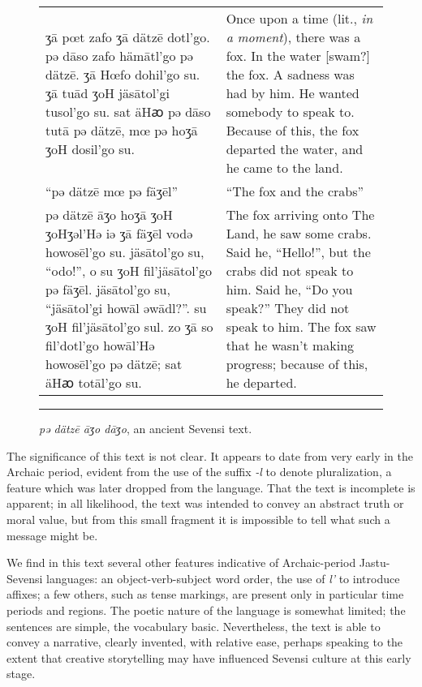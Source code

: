 \begin{figure}[ht]

\centering\small

\begin{tabular}{p{200pt}p{200pt}}
{\raggedleft ʒā pœt zafo ʒā dätzē dotl’go.
pǝ dāso zafo hämātl’go pǝ dätzē.
ʒā Hœfo dohil'go su.
ʒā tuād ʒoH jäsātol’gi tusol’go su.
sat äHꜵ pǝ dāso tutā pǝ dätzē, mœ pǝ hoʒā ʒoH dosil’go su.\par}
&{\raggedright Once upon a time (lit., \emph{in a moment}), there was a fox.
In the water [swam?] the fox.
A sadness was had by him.
He wanted somebody to speak to.
Because of this, the fox departed the water, and he came to the land.\par}
\\{\raggedleft “pə dätzē mœ pə fäʒēl”\par}
&{\raggedright “The fox and the crabs”\par}
\\{\raggedleft pə dätzē āʒo hoʒā ʒoH ʒoHʒəl'Hə iə ʒā fäʒēl vodə howosēl'go su.
jäsātol'go su, “odo!”, o su ʒoH fil'jäsātol'go pə fäʒēl.
jäsātol'go su, “jäsātol'gi howāl əwādl?”.
su ʒoH fil'jäsātol'go sul.
zo ʒā so fil'dotl'go howāl'Hə howosēl'go pə dätzē; sat äHꜵ totāl'go su.\par}
&{\raggedright The fox arriving onto The Land, he saw some crabs.
Said he, “Hello!”, but the crabs did not speak to him.
Said he, “Do you speak?”
They did not speak to him.
The fox saw that he wasn't making progress; because of this, he departed.\par}
\end{tabular}

\caption{\emph{pə dätzē āʒo dāʒo}, an ancient Sevensi text.}
\label{archaic-translation}

\medskip\hrule

\end{figure}

The significance of this text is not clear.
It appears to date from very early in the Archaic period, evident from the use of the suffix \emph{-l} to denote pluralization, a feature which was later dropped from the language.
That the text is incomplete is apparent; in all likelihood, the text was intended to convey an abstract truth or moral value, but from this small fragment it is impossible to tell what such a message might be.

We find in this text several other features indicative of Archaic-period Jastu-Sevensi languages: an object-verb-subject word order, the use of \emph{l'} to introduce affixes; a few others, such as tense markings, are present only in particular time periods and regions.
The poetic nature of the language is somewhat limited; the sentences are simple, the vocabulary basic.
Nevertheless, the text is able to convey a narrative, clearly invented, with relative ease, perhaps speaking to the extent that creative storytelling may have influenced Sevensi culture at this early stage.

